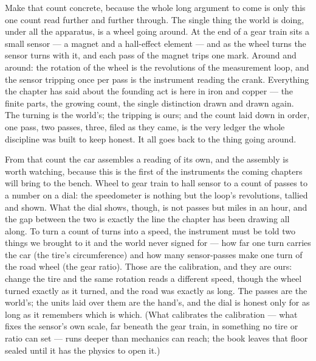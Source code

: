 Make that count concrete, because the whole long argument to come is only this one count read further and
further through. The single thing the world is doing, under all the apparatus, is a wheel going around. At the
end of a gear train sits a small sensor --- a magnet and a hall-effect element --- and as the wheel turns the
sensor turns with it, and each pass of the magnet trips one mark. Around and around: the rotation of the wheel
is the revolutions of the measurement loop, and the sensor tripping once per pass is the instrument reading the
crank. Everything the chapter has said about the founding act is here in iron and copper --- the finite parts,
the growing count, the single distinction drawn and drawn again. The turning is the world's; the tripping is
ours; and the count laid down in order, one pass, two passes, three, filed as they came, is the very ledger the
whole discipline was built to keep honest. It all goes back to the thing going around.

From that count the car assembles a reading of its own, and the assembly is worth watching, because this is the
first of the instruments the coming chapters will bring to the bench. Wheel to gear train to hall sensor to a
count of passes to a number on a dial: the speedometer is nothing but the loop's revolutions, tallied and
shown. What the dial shows, though, is not passes but miles in an hour, and the gap between the two is exactly
the line the chapter has been drawing all along. To turn a count of turns into a speed, the instrument must be
told two things we brought to it and the world never signed for --- how far one turn carries the car (the
tire's circumference) and how many sensor-passes make one turn of the road wheel (the gear ratio). Those are
the calibration, and they are ours: change the tire and the same rotation reads a different speed, though the
wheel turned exactly as it turned, and the road was exactly as long. The passes are the world's; the units laid
over them are the hand's, and the dial is honest only for as long as it remembers which is which. (What
calibrates the calibration --- what fixes the sensor's own scale, far beneath the gear train, in something no
tire or ratio can set --- runs deeper than mechanics can reach; the book leaves that floor sealed until it has
the physics to open it.)

